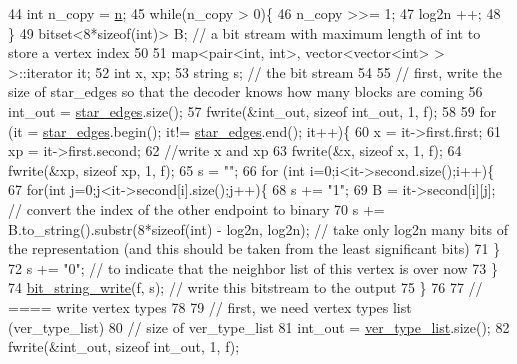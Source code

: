 \begin{DoxyCode}
44   \textcolor{keywordtype}{int} n\_copy = \hyperlink{classmarked__graph__compressed_a8d841016ddb11cfd33748c8deb6277ba}{n};
45   \textcolor{keywordflow}{while}(n\_copy > 0)\{
46     n\_copy >>= 1;
47     log2n ++;
48   \}
49   bitset<8*sizeof(int)> B; \textcolor{comment}{// a bit stream with maximum length of int to store a vertex index}
50 
51   map<pair<int, int>, vector<vector<int> > >::iterator it;
52   \textcolor{keywordtype}{int} x, xp;
53   \textcolor{keywordtype}{string} s; \textcolor{comment}{// the bit stream}
54 
55   \textcolor{comment}{// first, write the size of star\_edges so that the decoder knows how many blocks are coming}
56   int\_out = \hyperlink{classmarked__graph__compressed_a7df5779d313486644132bd816937f532}{star\_edges}.size();
57   fwrite(&int\_out, \textcolor{keyword}{sizeof} int\_out, 1, f);
58 
59   \textcolor{keywordflow}{for} (it = \hyperlink{classmarked__graph__compressed_a7df5779d313486644132bd816937f532}{star\_edges}.begin(); it!= \hyperlink{classmarked__graph__compressed_a7df5779d313486644132bd816937f532}{star\_edges}.end(); it++)\{
60     x = it->first.first;
61     xp = it->first.second;
62     \textcolor{comment}{//write x and xp}
63     fwrite(&x, \textcolor{keyword}{sizeof} x, 1, f);
64     fwrite(&xp, \textcolor{keyword}{sizeof} xp, 1, f);
65     s = \textcolor{stringliteral}{""};
66     \textcolor{keywordflow}{for} (\textcolor{keywordtype}{int} i=0;i<it->second.size();i++)\{
67       \textcolor{keywordflow}{for}(\textcolor{keywordtype}{int} j=0;j<it->second[i].size();j++)\{
68         s += \textcolor{stringliteral}{"1"};
69         B = it->second[i][j]; \textcolor{comment}{// convert the index of the other endpoint to binary}
70         s += B.to\_string().substr(8*\textcolor{keyword}{sizeof}(\textcolor{keywordtype}{int}) - log2n, log2n); \textcolor{comment}{// take only log2n many bits of the
       representation (and this should be taken from the least significant bits)}
71       \}
72       s += \textcolor{stringliteral}{"0"}; \textcolor{comment}{// to indicate that the neighbor list of this vertex is over now}
73     \}
74     \hyperlink{compression__helper_8cpp_accfebfd921b967c2f09e8c11569eb832}{bit\_string\_write}(f, s); \textcolor{comment}{// write this bitstream to the output}
75   \}
76 
77   \textcolor{comment}{// ==== write vertex types}
78 
79   \textcolor{comment}{// first, we need vertex types list (ver\_type\_list)}
80   \textcolor{comment}{// size of ver\_type\_list}
81   int\_out = \hyperlink{classmarked__graph__compressed_af2e3e55223d436628a02758dfae88493}{ver\_type\_list}.size();
82   fwrite(&int\_out, \textcolor{keyword}{sizeof} int\_out, 1, f);

\end{DoxyCode}
